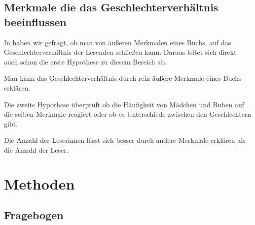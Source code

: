 \subsection{Merkmale die das Geschlechterverhältnis beeinflussen}

In  haben wir gefragt, ob man von äußeren Merkmalen
eines Buchs, auf das Geschlechterverhältnis der Lesenden schließen kann.
Daraus leitet sich direkt auch schon die erste Hypothese zu diesem
Bereich ab.

\begin{hyp}
    Man kann das Geschlechterverhältnis durch rein äußere Merkmale eines Buchs erklären.
\end{hyp}

Die zweite Hypothese überprüft ob die Häufigkeit von Mädchen und Buben
auf die selben Merkmale reagiert oder ob es Unterschiede zwischen den
Geschlechtern gibt.

\begin{subhyp}
    Die Anzahl der Leserinnen lässt sich besser durch andere Merkmale erklären als die Anzahl der Leser.
\end{subhyp}

\section{Methoden}

\subsection{Fragebogen}

